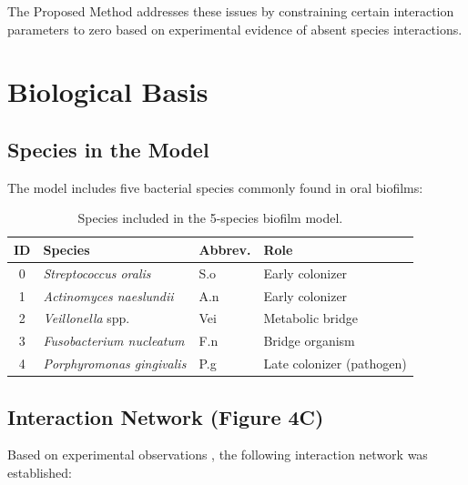 \documentclass[11pt,a4paper]{article}
\begin{document}
The Proposed Method addresses these issues by constraining certain interaction parameters to zero based on experimental evidence of absent species interactions.

\section{Biological Basis}

\subsection{Species in the Model}

The model includes five bacterial species commonly found in oral biofilms:

\begin{table}[h]
\centering
\begin{tabular}{clll}
\toprule
\textbf{ID} & \textbf{Species} & \textbf{Abbrev.} & \textbf{Role} \\
\midrule
0 & \textit{Streptococcus oralis} & S.o & Early colonizer \\
1 & \textit{Actinomyces naeslundii} & A.n & Early colonizer \\
2 & \textit{Veillonella} spp. & Vei & Metabolic bridge \\
3 & \textit{Fusobacterium nucleatum} & F.n & Bridge organism \\
4 & \textit{Porphyromonas gingivalis} & P.g & Late colonizer (pathogen) \\
\bottomrule
\end{tabular}
\caption{Species included in the 5-species biofilm model.}
\label{tab:species}
\end{table}

\subsection{Interaction Network (Figure 4C)}

Based on experimental observations \cite{Heine2025PeriImplant}, the following interaction network was established:
\end{document}
